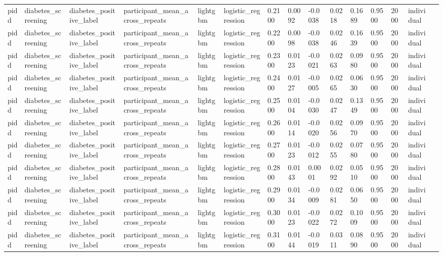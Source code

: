 \begin{tabular}{lllllllllllllll}
pidd & diabetes\_screening & diabetes\_positive\_label & participant\_mean\_across\_repeats & lightgbm & logistic\_regression & 0.2100 & 0.0092 & -0.0038 & 0.0218 & 0.1689 & 0.9500 & 2000 & individual &  \\
pidd & diabetes\_screening & diabetes\_positive\_label & participant\_mean\_across\_repeats & lightgbm & logistic\_regression & 0.2200 & 0.0098 & -0.0038 & 0.0246 & 0.1639 & 0.9500 & 2000 & individual &  \\
pidd & diabetes\_screening & diabetes\_positive\_label & participant\_mean\_across\_repeats & lightgbm & logistic\_regression & 0.2300 & 0.0123 & -0.0021 & 0.0263 & 0.0980 & 0.9500 & 2000 & individual &  \\
pidd & diabetes\_screening & diabetes\_positive\_label & participant\_mean\_across\_repeats & lightgbm & logistic\_regression & 0.2400 & 0.0127 & -0.0005 & 0.0265 & 0.0630 & 0.9500 & 2000 & individual &  \\
pidd & diabetes\_screening & diabetes\_positive\_label & participant\_mean\_across\_repeats & lightgbm & logistic\_regression & 0.2500 & 0.0104 & -0.0030 & 0.0247 & 0.1349 & 0.9500 & 2000 & individual &  \\
pidd & diabetes\_screening & diabetes\_positive\_label & participant\_mean\_across\_repeats & lightgbm & logistic\_regression & 0.2600 & 0.0114 & -0.0020 & 0.0256 & 0.0970 & 0.9500 & 2000 & individual &  \\
pidd & diabetes\_screening & diabetes\_positive\_label & participant\_mean\_across\_repeats & lightgbm & logistic\_regression & 0.2700 & 0.0123 & -0.0012 & 0.0255 & 0.0780 & 0.9500 & 2000 & individual &  \\
pidd & diabetes\_screening & diabetes\_positive\_label & participant\_mean\_across\_repeats & lightgbm & logistic\_regression & 0.2800 & 0.0143 & 0.0001 & 0.0292 & 0.0510 & 0.9500 & 2000 & individual &  \\
pidd & diabetes\_screening & diabetes\_positive\_label & participant\_mean\_across\_repeats & lightgbm & logistic\_regression & 0.2900 & 0.0134 & -0.0009 & 0.0281 & 0.0650 & 0.9500 & 2000 & individual &  \\
pidd & diabetes\_screening & diabetes\_positive\_label & participant\_mean\_across\_repeats & lightgbm & logistic\_regression & 0.3000 & 0.0123 & -0.0022 & 0.0272 & 0.1009 & 0.9500 & 2000 & individual &  \\
pidd & diabetes\_screening & diabetes\_positive\_label & participant\_mean\_across\_repeats & lightgbm & logistic\_regression & 0.3100 & 0.0144 & -0.0019 & 0.0311 & 0.0890 & 0.9500 & 2000 & individual &  \\

\end{tabular}
